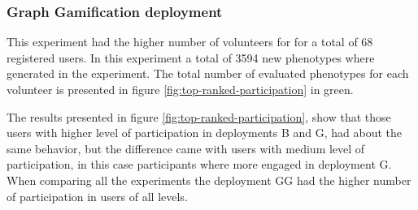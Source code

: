 \documentclass[conference]{IEEEtran}
\begin{document}
\subsubsection{ Graph Gamification deployment}
This experiment had the higher number of volunteers for for a total of 68 registered users. 
In this experiment a total of 3594 new phenotypes where generated in the experiment. 
The total number of evaluated phenotypes for each volunteer is presented in figure 
\ref{fig:top-ranked-participation} in green. 

The results presented in figure \ref{fig:top-ranked-participation}, show that those users with
higher level of participation in deployments B and G, had about the same behavior, but the difference
came with users with medium level of participation, in this case participants where more engaged in deployment
G. When comparing all the experiments the deployment GG had the higher number of participation in users
of all levels.    
\end{document}
